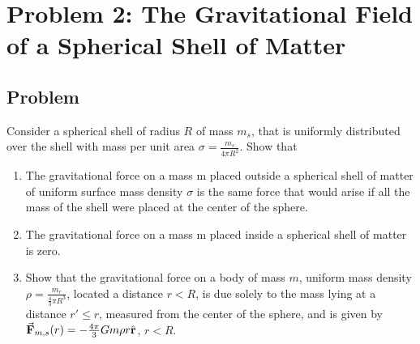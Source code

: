 \documentclass[solutions]{esg8012pset}
\begin{document}
\section*{Problem 2: The Gravitational Field of a Spherical Shell of Matter}
\subsection*{Problem}
  Consider a spherical shell of radius $R$ of mass $m_s$, that is uniformly distributed over the shell with mass per unit area $\sigma = \frac{m_s}{4\pi R^2}$.  Show that
  \begin{enumerate}[1)]
    \item The gravitational force on a mass m placed outside a spherical shell of matter of uniform surface mass density $\sigma$ is the same force that would arise if all the mass of the shell were placed at the center of the sphere.
    \item The gravitational force on a mass m placed inside a spherical shell of matter is zero.
    \item Show that the gravitational force on a body of mass $m$, uniform mass density $\rho = \frac{m_r}{\frac{4}{3}\pi R^3}$, located a distance $r<R$, is due solely to the mass lying at a distance $r'\leq r$, measured from the center of the sphere, and is given by $\vec{\bf{F}}_{m,s}(r)=-\frac{4\pi}{3}Gm\rho r\hat{\bf{r}}$, $r<R$.
  \end{enumerate}
\end{document}
